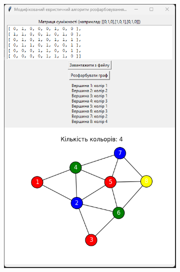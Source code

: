 \documentclass[12pt,a4paper]{article}
\begin{document}
\begin{figure}[htbp]
\begin{subfigure}{0.35\textwidth}
            \includegraphics[width=\linewidth]{ex1.png}
            \label{fig:b}
        \end{subfigure}


\end{figure}
\end{document}
